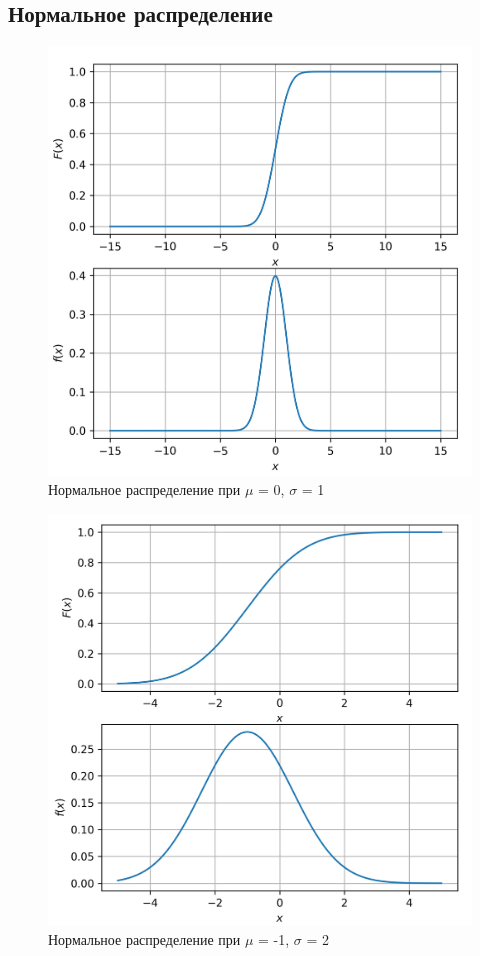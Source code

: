 \documentclass[a4paper, 12pt]{article}
\begin{document}
\subsection{Нормальное распределение}
\begin{figure}[h!]
	\centering \includegraphics[scale=0.8]{norm1}
	\centering\caption{Нормальное распределение при $\mu$ = 0, $\sigma$ = 1}
\end{figure}
\clearpage
\newpage
\begin{figure}[t!]
	\centering \includegraphics[scale=0.8]{norm2}
	\centering\caption{Нормальное распределение при $\mu$ = -1, $\sigma$ = 2}
\end{figure}
\end{document}
